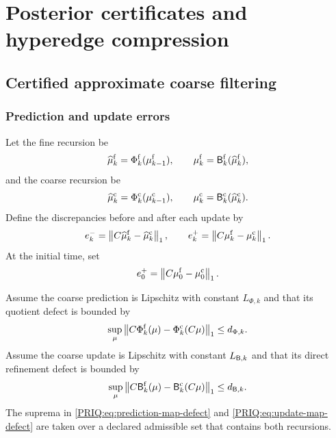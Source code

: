 \chapter{Posterior certificates and hyperedge compression}\label{PRIQ:book:chapter-43}
\section{Certified approximate coarse filtering}\label{PRIQ:sec:filter-cert}

\subsection{Prediction and update errors}
Let the fine recursion be
\begin{equation}\label{PRIQ:eq:fine-filter-recursion}
  \widehat\mu_k^{\mathrm f}
  =\Phi_k^{\mathrm f}(\mu_{k-1}^{\mathrm f}),
  \qquad
  \mu_k^{\mathrm f}
  =\mathsf B_k^{\mathrm f}(\widehat\mu_k^{\mathrm f}),
\end{equation}
and the coarse recursion be
\begin{equation}\label{PRIQ:eq:coarse-filter-recursion}
  \widehat\mu_k^{\mathrm c}
  =\Phi_k^{\mathrm c}(\mu_{k-1}^{\mathrm c}),
  \qquad
  \mu_k^{\mathrm c}
  =\mathsf B_k^{\mathrm c}(\widehat\mu_k^{\mathrm c}).
\end{equation}
Define the discrepancies before and after each update by
\begin{equation}\label{PRIQ:eq:pre-post-errors}
  e_k^-
  =\left\lVert C\widehat\mu_k^{\mathrm f}-\widehat\mu_k^{\mathrm c}\right\rVert_1,
  \qquad
  e_k^+
  =\left\lVert C\mu_k^{\mathrm f}-\mu_k^{\mathrm c}\right\rVert_1.
\end{equation}
At the initial time, set
\[
  e_0^+=\left\lVert C\mu_0^{\mathrm f}-\mu_0^{\mathrm c}\right\rVert_1.
\]

Assume the coarse prediction is Lipschitz with constant $L_{\Phi,k}$ and that its quotient defect is bounded by
\begin{equation}\label{PRIQ:eq:prediction-map-defect}
  \sup_{\mu}
  \left\lVert C\Phi_k^{\mathrm f}(\mu)-\Phi_k^{\mathrm c}(C\mu)\right\rVert_1
  \leq d_{\Phi,k}.
\end{equation}
Assume the coarse update is Lipschitz with constant $L_{\mathsf B,k}$ and that its direct refinement defect is bounded by
\begin{equation}\label{PRIQ:eq:update-map-defect}
  \sup_{\mu}
  \left\lVert C\mathsf B_k^{\mathrm f}(\mu)-\mathsf B_k^{\mathrm c}(C\mu)\right\rVert_1
  \leq d_{\mathsf B,k}.
\end{equation}
The suprema in \eqref{PRIQ:eq:prediction-map-defect} and \eqref{PRIQ:eq:update-map-defect} are taken over a declared admissible set that contains both recursions.

